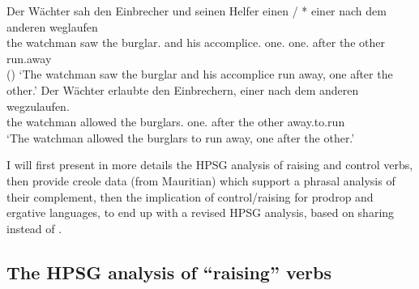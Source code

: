 \eal
\label{german2}
\ex 
\gll Der Wächter  sah den Einbrecher     und seinen Helfer            einen       / *  einer nach dem anderen weglaufen\\
     the watchman saw the burglar.\ACC{} and his    accomplice.\ACC{} one.\ACC{} {} {} one.\NOM{} after the other run.away\\\hfill()
\glt `The watchman saw the burglar and his accomplice run away, one after the other.'
\ex
\gll Der Wächter erlaubte den Einbrechern, einer nach dem anderen wegzulaufen.\\
     the watchman  allowed the burglars.\DAT{} one.\NOM{} after the other away.to.run\\
\glt `The watchman allowed the burglars to run away, one after the other.'
\zl

I will first present in more details the HPSG analysis of raising and
control verbs, then provide creole data (from Mauritian) which support a phrasal analysis of their
complement, then the implication of control/raising for prodrop and ergative languages, to end up
with a revised HPSG analysis, based on sharing \xarg instead of \subj. 

\subsection{The HPSG analysis of ``raising'' verbs}
\label{control:sec-HPSG-anaylsis-of-raising}

